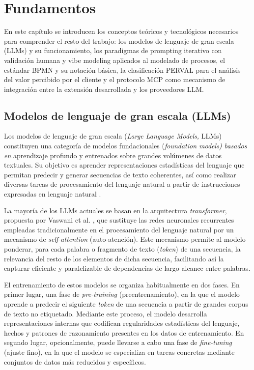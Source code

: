 

\chapter{Fundamentos}

En este capítulo se introducen los conceptos teóricos y tecnológicos necesarios para comprender el resto del trabajo: los modelos de lenguaje de gran escala (LLMs) y su funcionamiento, los paradigmas de prompting iterativo con validación humana y vibe modeling aplicados al modelado de procesos, el estándar BPMN y su notación básica, la clasificación PERVAL para el análisis del valor percibido por el cliente y el protocolo MCP como mecanismo de integración entre la extensión desarrollada y los proveedores LLM.  

\section{Modelos de lenguaje de gran escala (LLMs)}

Los modelos de lenguaje de gran escala (\textit{Large Language Models,} LLMs)  constituyen una categoría de modelos fundacionales (\textit{foundation models) basados en}  aprendizaje profundo y entrenados sobre grandes volúmenes de datos textuales. Su  objetivo  es aprender  representaciones estadísticas del lenguaje  que  permitan predecir y generar  secuencias de texto coherentes, así como realizar diversas tareas de procesamiento del lenguaje natural a partir de instrucciones expresadas en lenguaje natural  \cite{bommasani2021}. 

La mayoría de los LLMs actuales se basan en la arquitectura \textit{transformer}, propuesta por Vaswani et al. \cite{vaswani2017}, que sustituye las redes  neuronales recurrentes empleadas tradicionalmente en el procesamiento del lenguaje natural por un mecanismo de \textit{self-attention} (auto-atención). Este mecanismo permite al modelo ponderar, para cada palabra o fragmento de texto (\textit{token}) de una secuencia, la relevancia del resto de los elementos de dicha secuencia,  facilitando así la capturar  eficiente y paralelizable de dependencias de largo alcance entre palabras.

El entrenamiento de estos modelos se organiza habitualmente en dos fases. En primer lugar, una fase de \textit{pre-training} (preentrenamiento), en la que el modelo aprende a predecir el siguiente \textit{token} de una secuencia a partir de grandes corpus de texto no etiquetado. Mediante este proceso,  el modelo desarrolla representaciones internas que codifican regularidades estadísticas del lenguaje, hechos y patrones de razonamiento presentes en los datos de entrenamiento. En segundo lugar, opcionalmente,  puede llevarse a cabo una fase de \textit{fine-tuning} (ajuste fino), en la que el modelo se especializa en tareas concretas mediante conjuntos de datos más reducidos y específicos.

